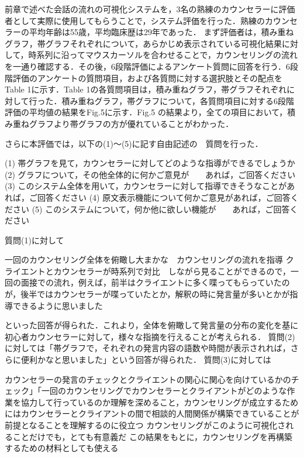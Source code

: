 \documentclass[shuuron]{kuee}
\begin{document}
前章で述べた会話の流れの可視化システムを，3名の熟練のカウンセラーに評価者として実際に使用してもらうことで，システム評価を行った．熟練のカウンセラーの平均年齢は55歳，平均臨床歴は29年であった．
まず評価者は，積み重ねグラフ，帯グラフそれぞれについて，あらかじめ表示されている可視化結果に対して，時系列に沿ってマウスカーソルを合わせることで，カウンセリングの流れを一通り確認する．その後，6段階評価によるアンケート質問に回答を行う．6段階評価のアンケートの質問項目，および各質問に対する選択肢とその配点をTable 1に示す．Table 1の各質問項目は，積み重ねグラフ，帯グラフそれぞれに対して行った．積み重ねグラフ，帯グラフについて，各質問項目に対する6段階評価の平均値の結果をFig.5に示す．Fig.5 の結果より，全ての項目において，積み重ねグラフより帯グラフの方が優れていることがわかった．


さらに本評価では，以下の(1)～(5)に記す自由記述の　質問を行った．

(1)	帯グラフを見て，カウンセラーに対してどのような指導ができるでしょうか
(2)	グラフについて，その他全体的に何かご意見が　　あれば，ご回答ください
(3)	このシステム全体を用いて，カウンセラーに対して指導できそうなことがあれば，ご回答ください
(4)	原文表示機能について何かご意見があれば，ご回答ください
(5)	このシステムについて，何か他に欲しい機能が　　あれば，ご回答ください

質問(1)に対して

  一回のカウンセリング全体を俯瞰し大まかな　カウンセリングの流れを指導
  クライエントとカウンセラーが時系列で対比　しながら見ることができるので，一回の面接での流れ，例えば，前半はクライエントに多く喋ってもらっていたのが，後半ではカウンセラーが喋っていたとか，解釈の時に発言量が多いとかが指導できるように思いました

といった回答が得られた．これより，全体を俯瞰して発言量の分布の変化を基に初心者カウンセラーに対して，様々な指摘を行えることが考えられる．
質問(2)に対しては「帯グラフで，それぞれの発言内容の語数や時間が表示されれば，さらに便利かなと思いました」という回答が得られた．
質問(3)に対しては

  カウンセラーの発言のチェックとクライエントの関心に関心を向けているかのチェック」「一回のカウンセリングでカウンセラーとクライアントがどのような作業を協力して行っているのか理解を深めること，カウンセリングが成立するためにはカウンセラーとクライアントの間で相談的人間関係が構築できていることが前提となることを理解するのに役立つ
  カウンセリングがこのように可視化されることだけでも，とても有意義だ
  この結果をもとに，カウンセリングを再構築するための材料としても使える
\end{document}
